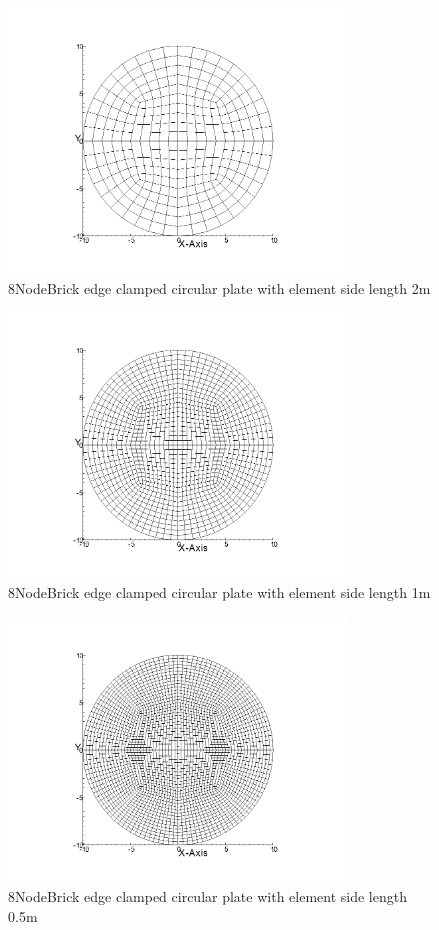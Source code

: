 \documentclass[fleqn,11pt,letter]{article}
\begin{document}
\begin{figure}[H]
  \centering
  \includegraphics[width=9cm]{../Figure_files/8NodeBrick/circular_plate3.png}
  \caption{8NodeBrick edge clamped circular plate with element side length 2m }
  \label{fig 8NodeBrick edges clamped circular plate with element side length 2m }
\end{figure}

\newpage

\begin{figure}[H]
  \centering
  \includegraphics[width=9cm]{../Figure_files/8NodeBrick/circular_plate4.png}
  \caption{8NodeBrick edge clamped circular plate with element side length 1m }
  \label{fig 8NodeBrick edges clamped circular plate with element side length 1m }
\end{figure}


\begin{figure}[H]
  \centering
  \includegraphics[width=9cm]{../Figure_files/8NodeBrick/circular_plate5.png}
  \caption{8NodeBrick edge clamped circular plate with element side length 0.5m }
  \label{fig 8NodeBrick edges clamped circular plate with element side length 0.5m }
\end{figure}
\end{document}
